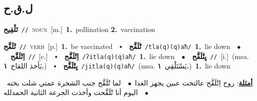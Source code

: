 \documentclass[10pt,a4paper,twoside]{article} %
\begin{document}
\begin{multicols}{2}
\vspace{-3mm}
\subsection*{\color{blue}\foreignlanguage{arabic}{ل.ق.ح}\color{blue}{}} 

{\setlength\topsep{0pt}\textbf{\foreignlanguage{arabic}{تَلْقِيح}}\ {\color{gray}\texttt{//}\color{black}}\ \textsc{noun}\ [m.]\ \textbf{1.}~pollination  \textbf{2.}~vaccination\ } \vspace{2mm}

{\setlength\topsep{0pt}\textbf{\foreignlanguage{arabic}{تْلَقَّح}}\ {\color{gray}\texttt{//}\color{black}}\ \textsc{verb}\ [p.]\ \textbf{1.}~be vaccinated\ \ $\smblkdiamond$\ \ \setlength\topsep{0pt}\textbf{\foreignlanguage{arabic}{تْلَقَّح}}\ {\color{gray}\texttt{/tla(q)(q)aħ/}\color{black}}\ \textbf{1.}~lie down\ \ $\bullet$\ \ \setlength\topsep{0pt}\textbf{\foreignlanguage{arabic}{اِتْلَقَّح}}\ {\color{gray}\texttt{//}\color{black}}\ [c.]\ \ $\smblkdiamond$\ \ \setlength\topsep{0pt}\textbf{\foreignlanguage{arabic}{اِتْلَقَّح}}\ {\color{gray}\texttt{/ʔitla(q)(q)aħ/}\color{black}}\ \textbf{1.}~lie down\ \ $\bullet$\ \ \setlength\topsep{0pt}\textbf{\foreignlanguage{arabic}{يِتْلَقَّح}}\ {\color{gray}\texttt{//}\color{black}}\ [i.]\ \color{gray}(msa. \foreignlanguage{arabic}{يَأخذ اللقاح}~\foreignlanguage{arabic}{\textbf{١.}})\color{black}\ \ $\smblkdiamond$\ \ \setlength\topsep{0pt}\textbf{\foreignlanguage{arabic}{يِتْلَقَّح}}\ {\color{gray}\texttt{/jitla(q)(q)aħ/}\color{black}}\ \color{gray}(msa. \foreignlanguage{arabic}{يَسْتَلْقِي}~\foreignlanguage{arabic}{\textbf{١.}})\color{black}\ \textbf{1.}~lie down\  \begin{flushright}\color{gray}\foreignlanguage{arabic}{\textbf{\underline{\foreignlanguage{arabic}{أمثلة}}}: روح اِتْلَقَّح  عالتخت عبين يجهز الغدا\ $\bullet$\ \  لما تْلَقَّح  جنب الشجرة عمتي شلت بخته\ $\bullet$\ \  اليوم أنا تْلَقَّحت وأخذت الجرعة الثانية الحمدلله}\end{flushright}\color{black}} \vspace{2mm}


\end{multicols}
\end{document}

